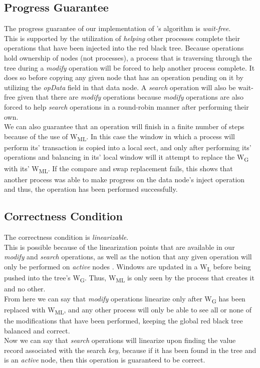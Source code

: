 \documentclass[letterpaper, 10 pt, conference]{ieeeconf}
\begin{document}
	\subsection{Progress Guarantee}
	The progress guarantee of our implementation of \cite{c1}'s algorithm is \textit{wait-free}. \\
	This is supported by the utilization of \textit{helping} other processes complete their operations that have been injected into the red black tree. Because operations hold ownership of nodes (not processes), a process that is traversing through the tree during a \textit{modify} operation will be forced to help another process complete. It does so before copying any given node that has an operation pending on it by utilizing the \textit{opData} field in that data node. A \textit{search} operation will also be wait-free given that there are \textit{modify} operations because \textit{modify} operations are also forced to help \textit{search} operations in a round-robin manner after performing their own.\\
	We can also guarantee that an operation will finish in a finite number of steps because of the use of W\textsubscript{ML}. In this case the window in which a process will perform its' transaction is copied into a local sect, and only after performing its' operations and balancing in its' local window will it attempt to replace the W\textsubscript{G} with its' W\textsubscript{ML}. If the compare and swap replacement fails, this shows that another process was able to make progress on the data node's inject operation and thus, the operation has been performed successfully.
	\subsection{Correctness Condition}
	The correctness condition is \textit{linearizable}. \\
	This is possible because of the linearization points that are available in our \textit{modify} and \textit{search} operations, as well as the notion that any given operation will only be performed on \textit{active} nodes \cite{c5}. Windows are updated in a W\textsubscript{L} before being pushed into the tree's W\textsubscript{G}. Thus, W\textsubscript{ML} is only seen by the process that creates it and no other. \\
	From here we can say that \textit{modify} operations linearize only after W\textsubscript{G} has been replaced with W\textsubscript{ML}, and any other process will only be able to see all or none of the modifications that have been performed, keeping the global red black tree balanced and correct. \\
	Now we can say that \textit{search} operations will linearize upon finding the value record associated with the search \textit{key}, because if it has been found in the tree and is an \textit{active} node, then this operation is guaranteed to be correct.
	
\end{document}
